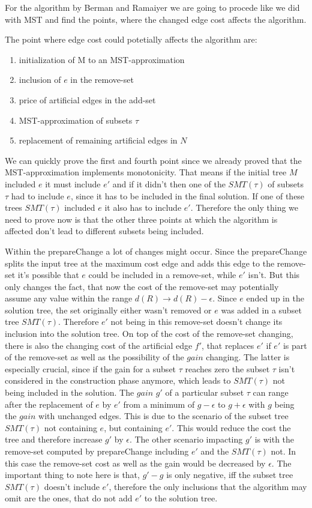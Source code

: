 For the algorithm by Berman and Ramaiyer we are going to procede like we did with MST and find the points, where the changed edge cost affects the algorithm.

The point where edge cost could potetially affects the algorithm are:
\begin{enumerate}
\item initialization of M to an MST-approximation
\item inclusion of $e$ in the remove-set
\item price of artificial edges in the add-set
\item MST-approximation of subsets $\tau$
\item replacement of remaining artificial edges in $N$
\end{enumerate}

We can quickly prove the first and fourth point since we already proved that the MST-approximation implements monotonicity. That means if the initial tree $M$ included $e$ it must include $e'$ and if it didn't then one of the $SMT(\tau)$ of subsets $\tau$ had to include $e$, since it has to be included in the final solution. If one of these trees $SMT(\tau)$ included $e$ it also has to include $e'$. Therefore the only thing we need to prove now is that the other three points at which the algorithm is affected don't lead to different subsets being included. 

Within the prepareChange a lot of changes might occur. Since the prepareChange splits the input tree at the maximum cost edge and adds this edge to the remove-set it's possible that $e$ could be included in a remove-set, while $e'$ isn't. But this only changes the fact, that now the cost of the remove-set may potentially assume any value within the range $d(R) \to d(R)-\epsilon$. Since $e$ ended up in the solution tree, the set originally either wasn't removed or $e$ was added in a subset tree $SMT(\tau)$. Therefore $e'$ not being in this remove-set doesn't change its inclusion into the solution tree. On top of the cost of the remove-set changing, there is also the changing cost of the artificial edge $f'$, that replaces $e'$ if $e'$ is part of the remove-set as well as the possibility of the $gain$ changing. The latter is especially crucial, since if the gain for a subset $\tau$ reaches zero the subset $\tau$ isn't considered in the construction phase anymore, which leads to $SMT(\tau)$ not being included in the solution. The $gain$ $g'$ of a particular subset $\tau$ can range after the replacement of $e$ by $e'$ from a minimum of $g-\epsilon$ to $g+\epsilon$ with $g$ being the $gain$ with unchanged edges. This is due to the scenario of the subset tree $SMT(\tau)$ not containing $e$, but containing $e'$. This would reduce the cost the tree and therefore increase $g'$ by $\epsilon$. The other scenario impacting $g'$ is with the remove-set computed by prepareChange including $e'$ and the $SMT(\tau)$ not. In this case the remove-set cost as well as the gain would be decreased by $\epsilon$. 
The important thing to note here is that, $g'-g$ is only negative, iff the subset tree $SMT(\tau)$ doesn't include $e'$, therefore the only inclusions that the algorithm may omit are the ones, that do not add $e'$ to the solution tree.  

